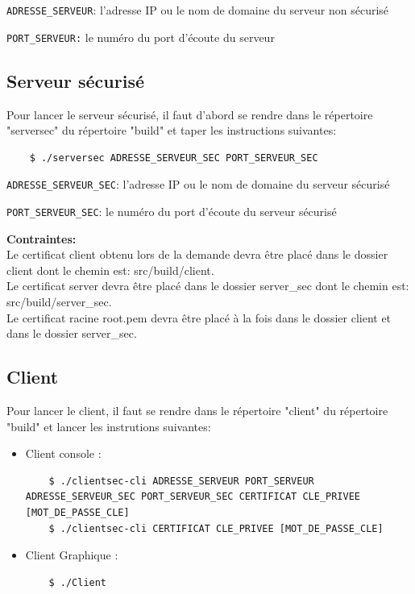 \documentclass[a4paper,11pt,french]{book}
\begin{document}
\verb+ADRESSE_SERVEUR+: l'adresse IP ou le nom de domaine du serveur non sécurisé

\verb+PORT_SERVEUR:+ le numéro du port d'écoute du serveur

\subsection{Serveur sécurisé}
Pour lancer le serveur sécurisé, il faut d'abord se rendre dans le répertoire "serversec" du répertoire "build" et taper les instructions suivantes:
\begin{verbatim}
    $ ./serversec ADRESSE_SERVEUR_SEC PORT_SERVEUR_SEC
\end{verbatim}

\verb+ADRESSE_SERVEUR_SEC+: l'adresse IP ou le nom de domaine du serveur sécurisé

\verb+PORT_SERVEUR_SEC+: le numéro du port d'écoute du serveur sécurisé
\\
\vspace{1.4cm}

\textbf{Contraintes:}\\ Le certificat client obtenu lors de la demande devra être placé dans le dossier client dont le chemin est: src/build/client.\\
Le certificat server devra être placé dans le dossier server\_sec dont le chemin est: src/build/server\_sec.\\
Le certificat racine root.pem devra être placé à la fois dans le dossier client et dans le dossier server\_sec.

\subsection{Client}
Pour lancer le client, il faut se rendre dans le répertoire "client" du répertoire "build" et lancer les instrutions suivantes:
\begin{itemize}
\item Client console : 
\begin{verbatim}
    $ ./clientsec-cli ADRESSE_SERVEUR PORT_SERVEUR ADRESSE_SERVEUR_SEC PORT_SERVEUR_SEC CERTIFICAT CLE_PRIVEE [MOT_DE_PASSE_CLE]
    $ ./clientsec-cli CERTIFICAT CLE_PRIVEE [MOT_DE_PASSE_CLE]
\end{verbatim}
\item Client Graphique :
\begin{verbatim}
    $ ./Client
\end{verbatim}
\end{itemize}
\end{document}
